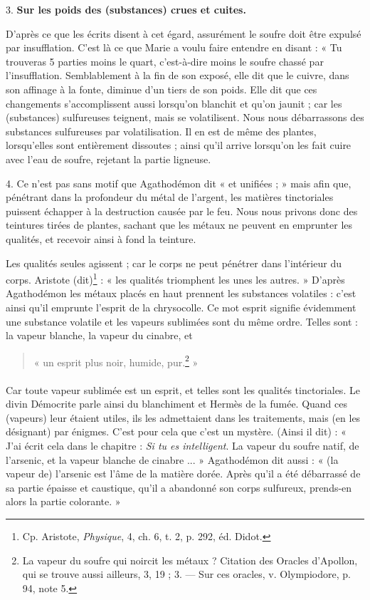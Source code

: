 \documentclass[landscape, a4paper, 11pt, oneside, polutonikogreek, french]{article}
\begin{document}
3. \textbf{Sur les poids des (substances) crues et cuites.}

D'après ce que les écrits disent à cet égard, assurément le soufre doit être expulsé par insufflation. C'est là ce que Marie a voulu faire entendre en disant : « Tu trouveras 5 parties moins le quart, c'est-à-dire moins le soufre chassé par l'insufflation. Semblablement à la fin de son exposé, elle dit que le cuivre, dans son affinage à la fonte, diminue d'un tiers de son poids. Elle dit que ces changements s'accomplissent aussi lorsqu'on blanchit et qu'on jaunit ; car les (substances) sulfureuses teignent, mais se volatilisent. Nous nous débarrassons des substances sulfureuses par volatilisation. Il en est de même des plantes, lorsqu'elles sont entièrement dissoutes ; ainsi qu'il arrive lorsqu'on les fait cuire avec l'eau de soufre, rejetant la partie ligneuse.

4. Ce n'est pas sans motif que Agathodémon dit « et unifiées ; » mais afin que, pénétrant dans la profondeur du métal de l'argent, les matières tinctoriales puissent échapper à la destruction causée par le feu. Nous nous privons donc des teintures tirées de plantes, sachant que les métaux ne peuvent en emprunter les qualités, et recevoir ainsi à fond la teinture.

Les qualités seules agissent ; car le corps ne peut pénétrer dans l'intérieur du corps. Aristote (dit)\footnote{Cp. Aristote, \emph{Physique}, 4, ch. 6, t. 2, p. 292, éd. Didot.} : « les qualités triomphent les unes les autres. » D'après Agathodémon les métaux placés en haut prennent les substances volatiles : c'est ainsi qu'il emprunte l'esprit de la chrysocolle. Ce mot esprit signifie évidemment une substance volatile et les vapeurs sublimées sont du même ordre. Telles sont : la vapeur blanche, la vapeur du cinabre, et
\begin{quotation}
« un esprit plus noir, humide, pur.\footnote{La vapeur du soufre qui noircit les métaux ? Citation des Oracles d'Apollon, qui se trouve aussi ailleurs, 3, 19 ; 3. --- Sur ces oracles, v. Olympiodore, p. 94, note 5.} »
\end{quotation}
\paragraph{}
Car toute vapeur sublimée est un esprit, et telles sont les qualités tinctoriales. Le divin Démocrite parle ainsi du blanchiment et Hermès de la fumée. Quand ces (vapeurs) leur étaient utiles, ils les admettaient dans les traitements, mais (en les désignant) par énigmes. C'est pour cela que c'est un mystère. (Ainsi il dit) : « J'ai écrit cela dans le chapitre : \emph{Si tu es intelligent}. La vapeur du soufre natif, de l'arsenic, et la vapeur blanche de cinabre ... » Agathodémon dit aussi : « (la vapeur de) l'arsenic est l'âme de la matière dorée. Après qu'il a été débarrassé de sa partie épaisse et caustique, qu'il a abandonné son corps sulfureux, prends-en alors la partie colorante. »
\end{document}
